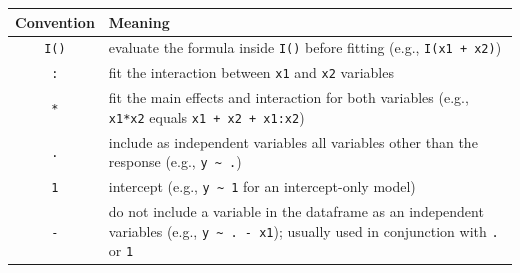 \documentclass[]{book}
\theoremstyle{definition}
\theoremstyle{definition}
\theoremstyle{definition}
\theoremstyle{remark}
\begin{document}
\begin{longtable}[]{@{}cl@{}}
\toprule
\begin{minipage}[b]{0.17\columnwidth}\centering\strut
Convention\strut
\end{minipage} & \begin{minipage}[b]{0.77\columnwidth}\raggedright\strut
Meaning\strut
\end{minipage}\tabularnewline
\midrule
\endhead
\begin{minipage}[t]{0.17\columnwidth}\centering\strut
\texttt{I()}\strut
\end{minipage} & \begin{minipage}[t]{0.77\columnwidth}\raggedright\strut
evaluate the formula inside \texttt{I()} before fitting (e.g.,
\texttt{I(x1\ +\ x2)})\strut
\end{minipage}\tabularnewline
\begin{minipage}[t]{0.17\columnwidth}\centering\strut
\texttt{:}\strut
\end{minipage} & \begin{minipage}[t]{0.77\columnwidth}\raggedright\strut
fit the interaction between \texttt{x1} and \texttt{x2} variables\strut
\end{minipage}\tabularnewline
\begin{minipage}[t]{0.17\columnwidth}\centering\strut
\texttt{*}\strut
\end{minipage} & \begin{minipage}[t]{0.77\columnwidth}\raggedright\strut
fit the main effects and interaction for both variables (e.g.,
\texttt{x1*x2} equals \texttt{x1\ +\ x2\ +\ x1:x2})\strut
\end{minipage}\tabularnewline
\begin{minipage}[t]{0.17\columnwidth}\centering\strut
\texttt{.}\strut
\end{minipage} & \begin{minipage}[t]{0.77\columnwidth}\raggedright\strut
include as independent variables all variables other than the response
(e.g., \texttt{y\ \textasciitilde{}\ .})\strut
\end{minipage}\tabularnewline
\begin{minipage}[t]{0.17\columnwidth}\centering\strut
\texttt{1}\strut
\end{minipage} & \begin{minipage}[t]{0.77\columnwidth}\raggedright\strut
intercept (e.g., \texttt{y\ \textasciitilde{}\ 1} for an intercept-only
model)\strut
\end{minipage}\tabularnewline
\begin{minipage}[t]{0.17\columnwidth}\centering\strut
\texttt{-}\strut
\end{minipage} & \begin{minipage}[t]{0.77\columnwidth}\raggedright\strut
do not include a variable in the dataframe as an independent variables
(e.g., \texttt{y\ \textasciitilde{}\ .\ -\ x1}); usually used in
conjunction with \texttt{.} or \texttt{1}\strut
\end{minipage}\tabularnewline
\bottomrule
\end{longtable}
\end{document}
